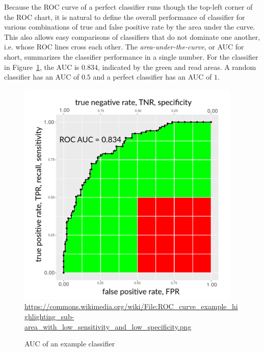 Because the ROC curve of a perfect classifier runs though the top-left corner of the ROC chart, it is natural to define the overall performance of classifier for various combinations of true and false positive rate by the area under the curve. This also allows easy comparisons of classifiers that do not dominate one another, i.e. whose ROC lines cross each other. The \emph{area-under-the-curve}, or AUC for short, summarizes the classifier performance in a single number. For the classifier in Figure~\ref{fig:auc}, the AUC is $0.834$, indicated by the green and read areas. A random classifier has an AUC of $0.5$ and a perfect classifier has an AUC of $1$. 

\begin{figure}
\centering
\includegraphics[width=.65\textwidth]{auc.png}
\scriptsize \url{https://commons.wikimedia.org/wiki/File:ROC_curve_example_highlighting_sub-area_with_low_sensitivity_and_low_specificity.png}

\caption{AUC of an example classifier}
\label{fig:auc}
\end{figure}

